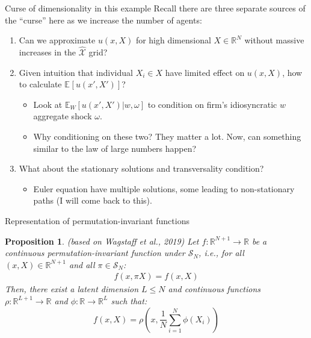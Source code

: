 \documentclass[aspectratio=169,10pt]{beamer}
\newtheorem{proposition}{Proposition}
\newcommand{\R}{\ensuremath{\mathbb{R}}}
\newcommand{\expec}[2][]{\ensuremath{\mathbb{E}_{{#1}}\left[ {#2} \right]}}
\newcommand{\Xtrain}{\hat{\mathcal{X}}}
\begin{document}
		\begin{frame}{Curse of dimensionality in this example}
			Recall there are three separate sources of the ``curse'' here as we increase the number of agents:
			\begin{enumerate}
				\item Can we approximate $u(x,X)$ for high dimensional $X\in \R^N$ without massive increases in the $\Xtrain$ grid?\medskip
					
		
				\item Given intuition that individual $X_i \in X$ have limited effect on $u(x,X)$, how to calculate $\expec{u(x',X')}$?\smallskip
					  \begin{itemize}
						  \item  Look at $\mathbb{E}_W[u(x', X')|w, \omega]$ to condition on firm's idiosyncratic $w$ aggregate shock $\omega$.\smallskip
						  \item Why conditioning on these two? They matter a lot. Now, can something similar to the law of large numbers happen?
					  \end{itemize}\medskip
				\item What about the stationary solutions and transversality condition?\smallskip
					  \begin{itemize}
						  \item Euler equation have multiple solutions, some leading to non-stationary paths (I will come back to this).  
					  \end{itemize}
			\end{enumerate}
		\end{frame}
		
		\begin{frame}{Representation of permutation-invariant functions }
		
			\begin{proposition}{ (based on Wagstaff et al., 2019)}
				Let  $f:\mathbb{R}^{N+1} \rightarrow \mathbb{R}$ be a continuous permutation-invariant function under $\mathcal{S}_N$, i.e., for all $(x,X) \in \mathbb{R}^{N+1}$ and all $\pi \in \mathcal{S}_N$:
				\begin{align*}
					f(x, \pi X) = f(x,X)
				\end{align*}
				Then, there exist a latent dimension $L\leq N$ and continuous functions $\rho : \mathbb{R}^{L+1}\rightarrow \mathbb{R}$ and $\phi: \mathbb{R} \rightarrow \mathbb{R}^L$ such that:
				\begin{equation*}
					f(x,X) = \rho \left(x,\frac{1}{N}\sum_{i=1}^N\phi(X_i)\right)
				\end{equation*}
				\vspace{-0.1in}
			\end{proposition}
		\end{frame}
	
\end{document}
